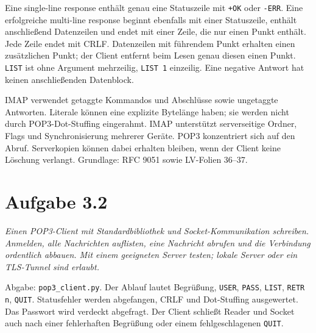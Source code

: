 \documentclass[a4paper,11pt]{article}
\newif\ifexplain
\newcommand{\aufgabe}[1]{\section*{Aufgabe #1}}
\newcommand{\angabe}[1]{\textit{#1}\par\smallskip}
\newcommand{\explain}[1]{\ifexplain\begin{erklbox}#1\end{erklbox}\fi}
\begin{document}
Eine single-line response enthält genau eine Statuszeile mit \texttt{+OK} oder \texttt{-ERR}. Eine erfolgreiche multi-line response beginnt ebenfalls mit einer Statuszeile, enthält anschließend Datenzeilen und endet mit einer Zeile, die nur einen Punkt enthält. Jede Zeile endet mit CRLF. Datenzeilen mit führendem Punkt erhalten einen zusätzlichen Punkt; der Client entfernt beim Lesen genau diesen einen Punkt. \texttt{LIST} ist ohne Argument mehrzeilig, \texttt{LIST 1} einzeilig. Eine negative Antwort hat keinen anschließenden Datenblock.
\explain{Die Punktzeile ist ein Endezeichen, keine Nachrichtendatei. Eine echte Mailzeile mit einem einzelnen Punkt wird daher als zwei Punkte übertragen. Auch Leerzeilen am Nachrichtenende gehören zum Inhalt und dürfen nicht durch pauschales Abschneiden verloren gehen.}

IMAP verwendet getaggte Kommandos und Abschlüsse sowie ungetaggte Antworten. Literale können eine explizite Bytelänge haben; sie werden nicht durch POP3-Dot-Stuffing eingerahmt. IMAP unterstützt serverseitige Ordner, Flags und Synchronisierung mehrerer Geräte. POP3 konzentriert sich auf den Abruf. Serverkopien können dabei erhalten bleiben, wenn der Client keine Löschung verlangt. Grundlage: RFC 9051 sowie LV-Folien 36--37.
\explain{Ein Tag wie \texttt{A001} ordnet bei IMAP das Ergebnis einer Anfrage zu. Das ist etwas anderes als die Nachrichtennummer bei POP3. Für den Vergleich zählt vor allem, wo Ordner und Lesestatus verwaltet werden.}

\aufgabe{3.2}
\angabe{Einen POP3-Client mit Standardbibliothek und Socket-Kommunikation schreiben. Anmelden, alle Nachrichten auflisten, eine Nachricht abrufen und die Verbindung ordentlich abbauen. Mit einem geeigneten Server testen; lokale Server oder ein TLS-Tunnel sind erlaubt.}

Abgabe: \texttt{pop3\_client.py}. Der Ablauf lautet Begrüßung, \texttt{USER}, \texttt{PASS}, \texttt{LIST}, \texttt{RETR n}, \texttt{QUIT}. Statusfehler werden abgefangen, CRLF und Dot-Stuffing ausgewertet. Das Passwort wird verdeckt abgefragt. Der Client schließt Reader und Socket auch nach einer fehlerhaften Begrüßung oder einem fehlgeschlagenen \texttt{QUIT}.
\explain{TCP liefert einen Bytestrom, keine vollständigen Antworten pro Empfangsaufruf. Der gepufferte Reader setzt deshalb auch fragmentierte Zeilen wieder zusammen. Die Statusprüfung kommt vor dem Lesen eines Datenblocks, weil eine Fehlermeldung gerade keinen mehrzeiligen Block ankündigt.}
\end{document}
